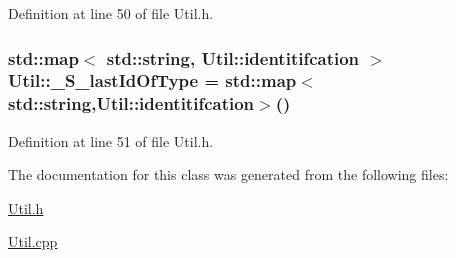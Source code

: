 Definition at line 50 of file Util.\-h.

\hypertarget{class_util_a06a8897362f4bd17c68d59557083fc56}{
\subsubsection[{\-\_\-\-S\-\_\-last\-Id\-Of\-Type}]{\setlength{\rightskip}{0pt plus 5cm}std\-::map$<$ std\-::string, {\bf Util\-::identitifcation} $>$ Util\-::\-\_\-\-S\-\_\-last\-Id\-Of\-Type = std\-::map$<$std\-::string,{\bf Util\-::identitifcation}$>$()\hspace{0.3cm}{\ttfamily [static]}}}\label{class_util_a06a8897362f4bd17c68d59557083fc56}


Definition at line 51 of file Util.\-h.



The documentation for this class was generated from the following files\-:\begin{DoxyCompactItemize}
\item 
\hyperlink{_util_8h}{Util.\-h}\item 
\hyperlink{_util_8cpp}{Util.\-cpp}\end{DoxyCompactItemize}
